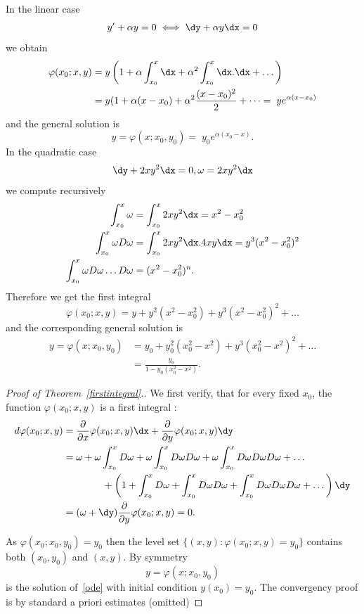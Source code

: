\begin{exam}
In the linear case
\[
y' + \alpha y = 0 \iff \dy + \alpha y \dx = 0
\]
we obtain
\begin{align*}
\varphi(x_0;x,y) &= y \left(1+ \alpha \int_{x_0}^x \dx + \alpha^2 \int_{x_0}^x \dx.\dx + \dots\right)\\
&= y(1 + \alpha(x-x_0) + \alpha^2 \frac{(x-x_0)^2}{2} + \dots =\;y e^{\alpha (x-x_0) }
\end{align*}
and the general solution is
\[
y = \varphi(x;x_0,y_0) =\; y_0 e^{\alpha (x_0-x) }.
\]
In the quadratic case
\[
\dy + 2 x y^2 \dx = 0, \omega = 2 x y^2 \dx
\]
we compute recursively
\begin{align*}
\int_{x_0}^x \omega &= \int_{x_0}^x 2 x y^2 \dx = x^2-x_0^2 \\
\int_{x_0}^x \omega D\omega & = \int_{x_0}^x 2 x y^2 \dx. 4 x y \dx = y^3 (x^2-x_0^2)^2 \\
\int_{x_0}^x \omega D\omega \dots D\omega &= (x^2-x_0^2)^n.
\end{align*}
Therefore we get the first integral
\[
\varphi(x_0;x,y) = y + y^2 (x^2-x_0^2) + y^3 (x^2-x_0^2)^2 + \dots
\]
and the corresponding general solution is
\begin{align*}
y= \varphi(x ; x_0,y_0) & = y_0 + y_0^2 (x_0^2-x^2) + y^3 (x^2_0-x^2)^2 + \dots \\
& = \frac{y_0}{1-y_0(x_0^2-x^2)}.
\end{align*}
\end{exam}

\begin{proof}[Proof of Theorem~\ref{firstintegral}.]
We first verify, that for every fixed $x_0$, the function $\varphi(x_0;x,y)$ is a first integral :
\begin{align*}
d\varphi(x_0;x,y)&=\frac{ \partial}{\partial x} \varphi(x_0;x,y) \dx + \frac{ \partial}{\partial y} \varphi(x_0;x,y) \dy \\
&= \omega + \omega \int_{x_0}^x D \omega + \omega \int_{x_0}^x D \omega D \omega + \omega \int_{x_0}^x D \omega D \omega D \omega + \dots \\
&\qquad\qquad+ \left(1 + \int_{x_0}^x D \omega + \int_{x_0}^x D \omega D \omega + \int_{x_0}^x D \omega D \omega D \omega + \dots\right) \dy \\
&= (\omega + \dy) \frac{ \partial}{\partial y} \varphi(x_0;x,y) = 0.
\end{align*}

As $\varphi(x_0;x_0,y_0) = y_0$ then the level set $\{ (x,y) : \varphi(x_0;x,y) = y_0 \}$ contains both $(x_0,y_0)$ and $(x,y)$. By symmetry
\[
y= \varphi(x;x_0,y_0)
\]
is the solution of~\eqref{ode} with initial condition $y(x_0)=y_0$. The convergency proof is by standard a priori estimates (omitted)
\end{proof}

